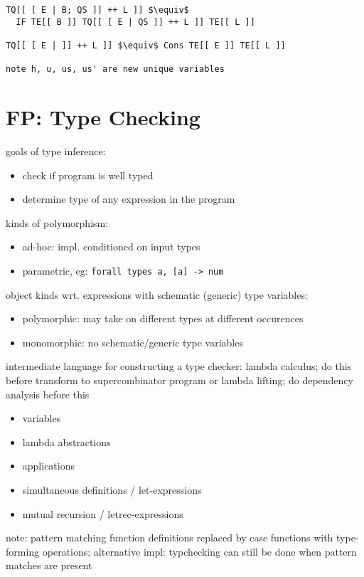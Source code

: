 \documentclass[8pt]{extarticle}
\begin{document}
\begin{multicols*}{2}
\begin{lstlisting}
TQ[[ [ E | B; QS ]] ++ L ]] $\equiv$
  IF TE[[ B ]] TQ[[ [ E | QS ]] ++ L ]] TE[[ L ]]

TQ[[ [ E | ]] ++ L ]] $\equiv$ Cons TE[[ E ]] TE[[ L ]]

note h, u, us, us' are new unique variables
\end{lstlisting}

\vfill\null
\columnbreak

\section{FP: Type Checking}

goals of type inference:
\begin{itemize}
\item check if program is well typed
\item determine type of any expression in the program
\end{itemize}

kinds of polymorphism:
\begin{itemize}
\item ad-hoc: impl. conditioned on input types
\item parametric, eg: \verb|forall types a, [a] -> num|
\end{itemize}

object kinds wrt. expressions with schematic (generic) type variables:
\begin{itemize}
\item polymorphic: may take on different types at different occurences
\item monomorphic: no schematic/generic type variables
\end{itemize}

intermediate language for constructing a type checker: lambda calculus; do this before transform to supercombinator program or lambda lifting; do dependency analysis before this
\begin{itemize}
\item variables
\item lambda abstractions
\item applications
\item simultaneous definitions / let-expressions
\item mutual recursion / letrec-expressions
\end{itemize}

note: pattern matching function definitions replaced by case functions with type-forming operations; alternative impl: typchecking can still be done when pattern matches are present


\end{multicols*}
\end{document}
